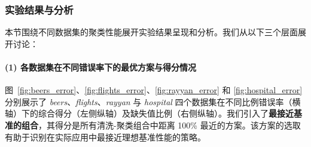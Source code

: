 \documentclass[10pt]{article} %
\numberwithin{equation}{section}
\begin{document}
\subsubsection{实验结果与分析}
\label{sec:exp_result_all}
本节围绕不同数据集的聚类性能展开实验结果呈现和分析。我们从以下三个层面展开讨论：
\paragraph{(1) 各数据集在不同错误率下的最优方案与得分情况}  
图~\ref{fig:beers_error}、\ref{fig:flights_error}、\ref{fig:rayyan_error} 和 \ref{fig:hospital_error} 分别展示了 \textit{beers}、\textit{flights}、\textit{rayyan} 与 \textit{hospital} 四个数据集在不同比例错误率（横轴）下的综合得分（左侧纵轴）及缺失值比例（右侧纵轴）。我们引入了\textbf{最接近基准的组合}，其得分是所有清洗-聚类组合中距离 100\% 最近的方案。该方案的选取有助于识别在实际应用中最接近理想基准性能的策略。
\end{document}
